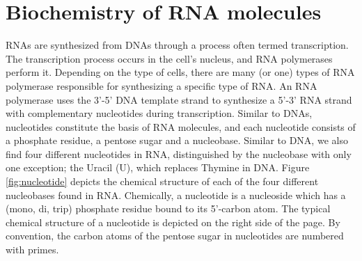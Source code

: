 \section{Biochemistry of RNA molecules}\label{sec:rna_biochemical}
{}
RNAs are synthesized from DNAs through a process often termed transcription. The transcription process occurs in the cell's nucleus, and RNA polymerases perform it. Depending on the type of cells, there are many (or one) types of RNA polymerase responsible for synthesizing a specific type of RNA. An RNA polymerase uses the 3’-5' DNA template strand to synthesize a 5’-3' RNA strand with complementary nucleotides during transcription. Similar to DNAs, nucleotides constitute the basis of  RNA molecules, and each nucleotide consists of a phosphate residue, a pentose sugar and a nucleobase. Similar to DNA, we also find four different nucleotides in RNA, distinguished by the nucleobase with only one exception; the Uracil (U), which replaces Thymine in DNA. Figure \ref{fig:nucleotide} depicts the chemical structure of each of the four different nucleobases found in RNA. Chemically, a nucleotide is a nucleoside which has a (mono, di, trip) phosphate residue bound to its 5'-carbon atom. The typical chemical structure of a nucleotide is depicted on the right side of the page. By convention, the carbon atoms of the pentose sugar in nucleotides are numbered with primes.

